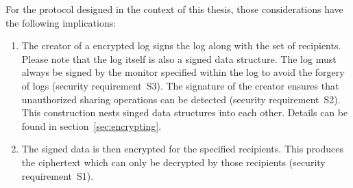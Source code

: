 \documentclass[../main.tex]{subfiles}
\begin{document}
For the protocol designed in the context of this thesis, those considerations have the following implications:
\begin{enumerate}
    \item 
    The creator of a encrypted log signs the log along with the set of recipients.
    Please note that the log itself is also a signed data structure.
    The log must always be signed by the monitor specified within the log to avoid the forgery of logs (security requirement~S3).
    The signature of the creator ensures that unauthorized sharing operations can be detected (security requirement~S2).
    This construction nests singed data structures into each other.
    Details can be found in section~\ref{sec:encrypting}.
    \item 
    The signed data is then encrypted for the specified recipients.
    This produces the ciphertext which can only be decrypted by those recipients (security requirement~S1).
\end{enumerate}
\end{document}
